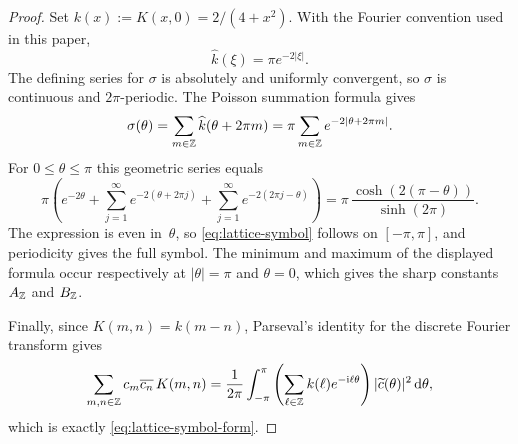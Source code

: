 \begin{proof}
Set $k(x):=K(x,0)=2/(4+x^2)$.  With the Fourier convention used in this
paper,
\[
\widehat k(\xi)=\pi e^{-2|\xi|}.
\]
The defining series for $\sigma$ is absolutely and uniformly convergent,
so $\sigma$ is continuous and $2\pi$-periodic.
The Poisson summation formula \cite[Chapter~III]{Stein1971} gives
\[
\sigma(\theta)=\sum_{m\in\mathbb{Z}}\widehat k(\theta+2\pi m)
=\pi\sum_{m\in\mathbb{Z}}e^{-2|\theta+2\pi m|}.
\]
For $0\le\theta\le\pi$ this geometric series equals
\[
\pi\left(e^{-2\theta}
+\sum_{j=1}^{\infty}e^{-2(\theta+2\pi j)}
+\sum_{j=1}^{\infty}e^{-2(2\pi j-\theta)}\right)
=\pi\,\frac{\cosh(2(\pi-\theta))}{\sinh(2\pi)}.
\]
The expression is even in~$\theta$, so \eqref{eq:lattice-symbol} follows
on $[-\pi,\pi]$, and periodicity gives the full symbol.
The minimum and maximum of the displayed formula occur respectively at
$|\theta|=\pi$ and $\theta=0$, which gives the sharp constants
$A_{\mathbb{Z}}$ and $B_{\mathbb{Z}}$.

Finally, since $K(m,n)=k(m-n)$, Parseval's identity for the discrete
Fourier transform gives
\[
\sum_{m,n\in\mathbb{Z}}c_m\overline{c_n}\,K(m,n)
=\frac{1}{2\pi}\int_{-\pi}^{\pi}
\left(\sum_{\ell\in\mathbb{Z}}k(\ell)e^{-\mathrm{i}\ell\theta}\right)
|\widetilde c(\theta)|^2\,\mathrm{d}\theta,
\]
which is exactly \eqref{eq:lattice-symbol-form}.
\end{proof}

